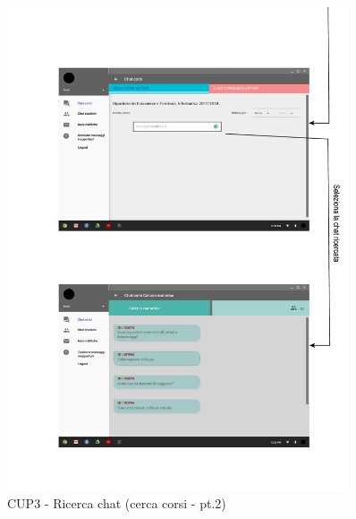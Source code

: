 \begin{figure}
	\centering
	\includegraphics[width=0.9\textwidth]{imgs/gruppo6/activities/act_cup3_ricerca_chat_corsi2.pdf}
	\caption{CUP3 - Ricerca chat (cerca corsi - pt.2)}
	\label{fig:cup3-6}
\end{figure}

